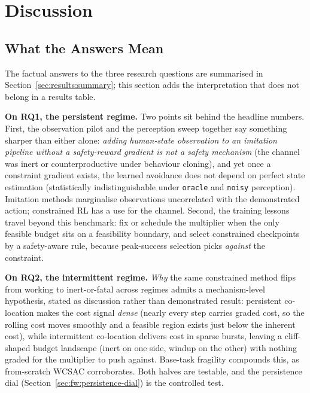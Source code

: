 \documentclass[11pt,a4paper]{report}
\begin{document}
\chapter{Discussion}
\label{ch:disc}

\section{What the Answers Mean}
\label{sec:disc:rqs-revisited}

The factual answers to the three research questions are summarised
in Section~\ref{sec:results:summary}; this section adds the
interpretation that does not belong in a results table.

\textbf{On RQ1, the persistent regime.} Two points sit behind the
headline numbers. First, the observation pilot and the perception
sweep together say something sharper than either alone:
\emph{adding human-state observation to an imitation pipeline
without a safety-reward gradient is not a safety mechanism} (the
channel was inert or counterproductive under behaviour cloning), and
yet once a constraint gradient exists, the learned avoidance does
not depend on perfect state estimation (statistically
indistinguishable under \texttt{oracle} and \texttt{noisy}
perception). Imitation methods marginalise observations
uncorrelated with the demonstrated action; constrained RL has a use
for the channel. Second, the training lessons travel beyond this
benchmark: fix or schedule the multiplier when the only feasible
budget sits on a feasibility boundary, and select constrained
checkpoints by a safety-aware rule, because peak-success selection
picks \emph{against} the constraint.

\textbf{On RQ2, the intermittent regime.} \emph{Why} the same
constrained method flips from working to inert-or-fatal across
regimes admits a mechanism-level hypothesis, stated as discussion
rather than demonstrated result: persistent co-location makes the
cost signal \emph{dense} (nearly every step carries graded cost, so
the rolling cost moves smoothly and a feasible region exists just
below the inherent cost), while intermittent co-location delivers
cost in sparse bursts, leaving a cliff-shaped budget landscape
(inert on one side, windup on the other) with nothing graded for
the multiplier to push against. Base-task fragility compounds this,
as from-scratch WCSAC corroborates. Both halves are testable, and
the persistence dial (Section~\ref{sec:fw:persistence-dial}) is the
controlled test.
\end{document}
